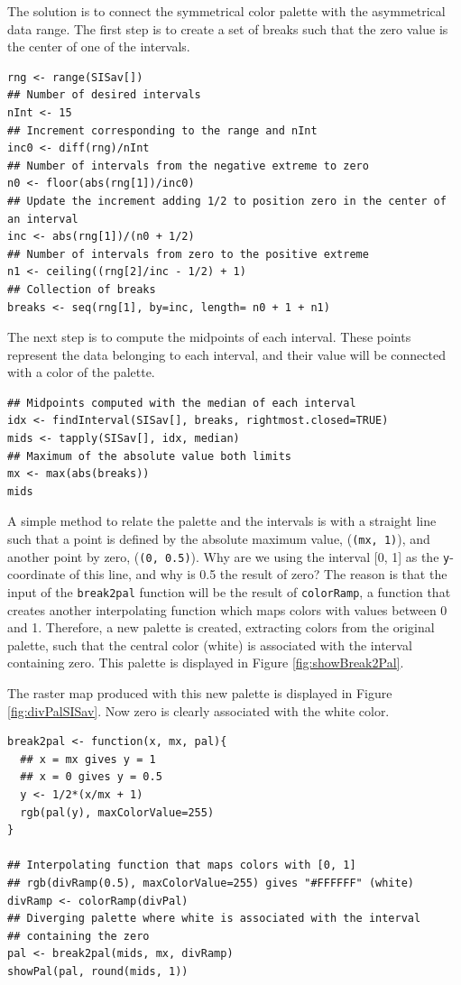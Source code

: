 \documentclass[smallroyalvopaper]{memoir}
\begin{document}
The solution is to connect the symmetrical color palette with the
asymmetrical data range. The first step is to create a set of
breaks such that the zero value is the center of one of the
intervals.
\lstset{language=R,numbers=none}
\begin{lstlisting}
rng <- range(SISav[])
## Number of desired intervals
nInt <- 15
## Increment corresponding to the range and nInt
inc0 <- diff(rng)/nInt
## Number of intervals from the negative extreme to zero
n0 <- floor(abs(rng[1])/inc0)
## Update the increment adding 1/2 to position zero in the center of an interval
inc <- abs(rng[1])/(n0 + 1/2)
## Number of intervals from zero to the positive extreme
n1 <- ceiling((rng[2]/inc - 1/2) + 1)
## Collection of breaks
breaks <- seq(rng[1], by=inc, length= n0 + 1 + n1)
\end{lstlisting}

The next step is to compute the midpoints of each interval. These
points represent the data belonging to each interval, and their value
will be connected with a color of the palette.

\lstset{language=R,numbers=none}
\begin{lstlisting}
## Midpoints computed with the median of each interval
idx <- findInterval(SISav[], breaks, rightmost.closed=TRUE)
mids <- tapply(SISav[], idx, median)
## Maximum of the absolute value both limits
mx <- max(abs(breaks))
mids
\end{lstlisting}

A simple method to relate the palette and the intervals is with a
straight line such that a point is defined by the absolute maximum
value, (\texttt{(mx, 1)}), and another point by zero, (\texttt{(0, 0.5)}).  Why are
we using the interval [0, 1] as the \texttt{y}-coordinate of this line, and
why is 0.5 the result of zero? The reason is that the input of the
\texttt{break2pal} function will be the result of \texttt{colorRamp}, a function
that creates another interpolating function which maps colors with
values between 0 and 1. Therefore, a new palette is created,
extracting colors from the original palette, such that the central
color (white) is associated with the interval containing zero. This
palette is displayed in Figure \ref{fig:showBreak2Pal}.

The raster map produced with this new palette is displayed in Figure
\ref{fig:divPalSISav}. Now zero is clearly associated with the white
color.
\lstset{language=R,numbers=none}
\begin{lstlisting}
break2pal <- function(x, mx, pal){
  ## x = mx gives y = 1
  ## x = 0 gives y = 0.5
  y <- 1/2*(x/mx + 1)
  rgb(pal(y), maxColorValue=255)
}

## Interpolating function that maps colors with [0, 1]
## rgb(divRamp(0.5), maxColorValue=255) gives "#FFFFFF" (white)
divRamp <- colorRamp(divPal)
## Diverging palette where white is associated with the interval
## containing the zero
pal <- break2pal(mids, mx, divRamp)
showPal(pal, round(mids, 1))
\end{lstlisting}
\end{document}
